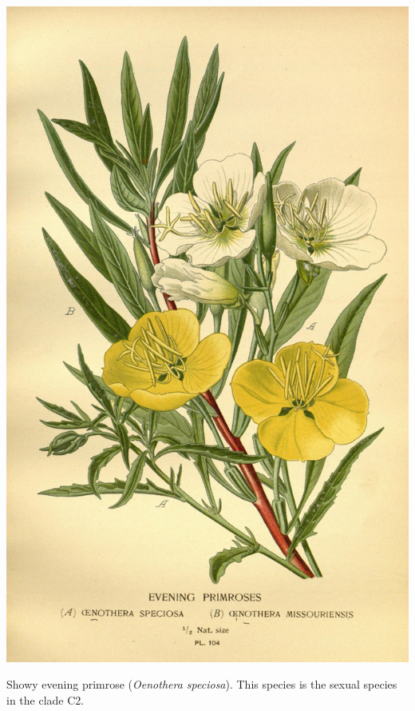 \subsection{}


\begin{marginfigure}[-3cm]
\begin{center}
  \includegraphics[width = \textwidth]{illustration_images/multiple_sel_loci/Evening_primrose/10575005313_f2c8839a80_k.jpg}
\end{center}
\caption{ Showy evening primrose ({\it Oenothera speciosa}). This species is the sexual species in the clade C2.   } \label{}  %
\end{marginfigure}
